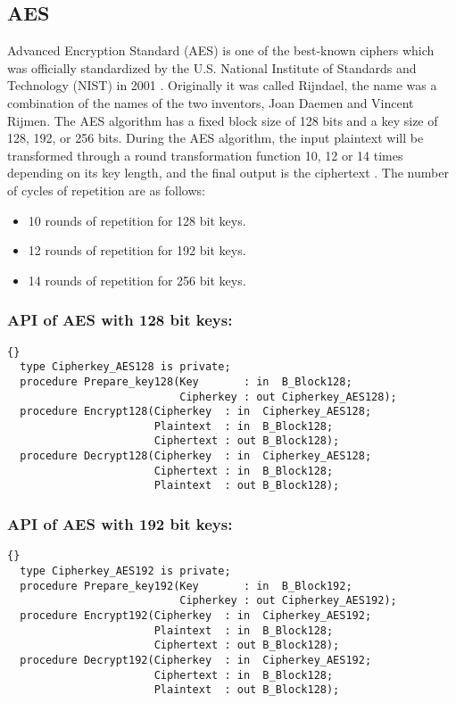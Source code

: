 
\subsection{AES}\label{AES}
Advanced Encryption Standard (AES) is one of the best-known ciphers
which was officially standardized by the U.S. National Institute of
Standards and Technology (NIST) in 2001 \cite{AES-FIPS}.  Originally
it was called Rijndael, the name was a combination of the names of the
two inventors, Joan Daemen and Vincent Rijmen. The AES algorithm has a
fixed block size of 128 bits and a key size of 128, 192, or 256 bits.
During the AES algorithm, the input plaintext will be transformed
through a round transformation function 10, 12 or 14 times depending
on its key length, and the final output is the ciphertext
\cite{AES-FIPS}. The number of cycles of repetition are as follows:
\begin{itemize}
\item 10 rounds of repetition for 128 bit keys.
\item 12 rounds of repetition for 192 bit keys.
\item 14 rounds of repetition for 256 bit keys.
\end{itemize}
\subsubsection*{API of AES with 128 bit keys:}
\begin{lstlisting}{}
  type Cipherkey_AES128 is private;
  procedure Prepare_key128(Key       : in  B_Block128;
                           Cipherkey : out Cipherkey_AES128);
  procedure Encrypt128(Cipherkey  : in  Cipherkey_AES128;
                       Plaintext  : in  B_Block128;
                       Ciphertext : out B_Block128);
  procedure Decrypt128(Cipherkey  : in  Cipherkey_AES128;
                       Ciphertext : in  B_Block128;
                       Plaintext  : out B_Block128);
\end{lstlisting}
\subsubsection*{API of AES with 192 bit keys:}
\begin{lstlisting}{}
  type Cipherkey_AES192 is private;
  procedure Prepare_key192(Key       : in  B_Block192;
                           Cipherkey : out Cipherkey_AES192);
  procedure Encrypt192(Cipherkey  : in  Cipherkey_AES192;
                       Plaintext  : in  B_Block128;
                       Ciphertext : out B_Block128);
  procedure Decrypt192(Cipherkey  : in  Cipherkey_AES192;
                       Ciphertext : in  B_Block128;
                       Plaintext  : out B_Block128);
\end{lstlisting}

